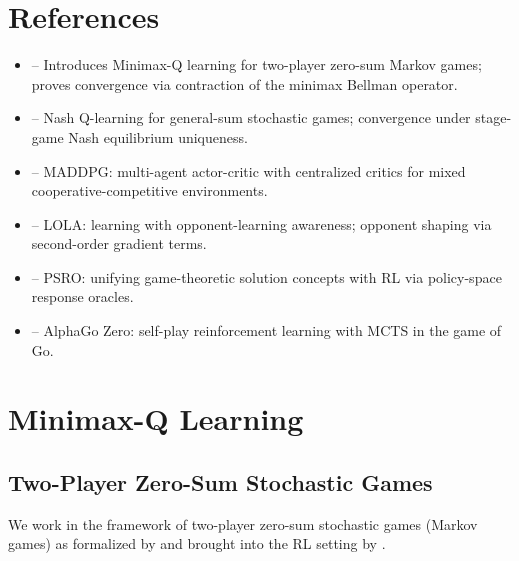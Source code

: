 \documentclass[11pt,a4paper]{article}
\begin{document}
\section{References}

\begin{itemize}
  \item \citet{littman1994} -- Introduces Minimax-Q learning for
    two-player zero-sum Markov games; proves convergence via contraction
    of the minimax Bellman operator.
  \item \citet{hu2003} -- Nash Q-learning for general-sum stochastic
    games; convergence under stage-game Nash equilibrium uniqueness.
  \item \citet{lowe2017} -- MADDPG: multi-agent actor-critic with
    centralized critics for mixed cooperative-competitive environments.
  \item \citet{foerster2018lola} -- LOLA: learning with opponent-learning
    awareness; opponent shaping via second-order gradient terms.
  \item \citet{lanctot2017} -- PSRO: unifying game-theoretic solution
    concepts with RL via policy-space response oracles.
  \item \citet{silver2017} -- AlphaGo Zero: self-play reinforcement
    learning with MCTS in the game of Go.
\end{itemize}


\section{Minimax-Q Learning}
\label{sec:minimaxq}

\subsection{Two-Player Zero-Sum Stochastic Games}

We work in the framework of two-player zero-sum stochastic games
(Markov games) as formalized by \citet{shapley1953} and brought into the
RL setting by \citet{littman1994}.
\end{document}
